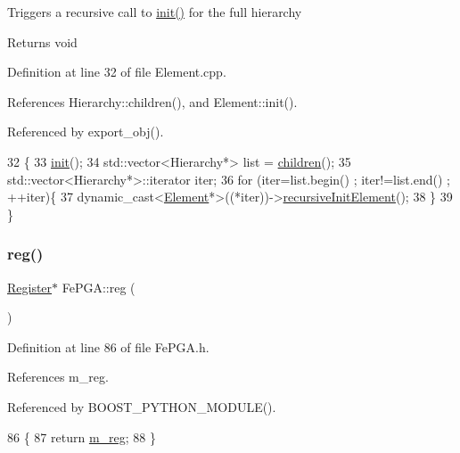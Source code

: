 Triggers a recursive call to \hyperlink{classFePGA_a5355858b1b8deedcc12acff80f025804}{init()} for the full hierarchy

\begin{DoxyReturn}{Returns}
void 
\end{DoxyReturn}


Definition at line 32 of file Element.\+cpp.



References Hierarchy\+::children(), and Element\+::init().



Referenced by export\+\_\+obj().


\begin{DoxyCode}
32                                   \{
33   \hyperlink{classElement_af42754b5cabc198869222725218d695c}{init}();
34   std::vector<Hierarchy*> list = \hyperlink{classHierarchy_aa9a76f69e98e052ee1a6e32cea006288}{children}();
35   std::vector<Hierarchy*>::iterator iter;
36   \textcolor{keywordflow}{for} (iter=list.begin() ; iter!=list.end() ; ++iter)\{
37     \textcolor{keyword}{dynamic\_cast<}\hyperlink{classElement}{Element}*\textcolor{keyword}{>}((*iter))->\hyperlink{classElement_a3c0abcb36f8906688bb7e32608df7086}{recursiveInitElement}();
38   \}
39 \}
\end{DoxyCode}
\mbox{\label{classFePGA_a7b9b52c0a8b2080ed6a1163f9dfc5553}} 
\subsubsection{\texorpdfstring{reg()}{reg()}}
{\footnotesize\ttfamily \hyperlink{classRegister}{Register}$\ast$ Fe\+P\+G\+A\+::reg (\begin{DoxyParamCaption}{ }\end{DoxyParamCaption})\hspace{0.3cm}{\ttfamily [inline]}}



Definition at line 86 of file Fe\+P\+G\+A.\+h.



References m\+\_\+reg.



Referenced by B\+O\+O\+S\+T\+\_\+\+P\+Y\+T\+H\+O\+N\+\_\+\+M\+O\+D\+U\+L\+E().


\begin{DoxyCode}
86                  \{
87     \textcolor{keywordflow}{return} \hyperlink{classFePGA_afdbe1ea67182ffdaaf62116d66839ad7}{m\_reg};
88   \}
\end{DoxyCode}
\mbox{\label{classAttrib_a7d4ef7e32d93cb287792b87b857e79f3}} 
